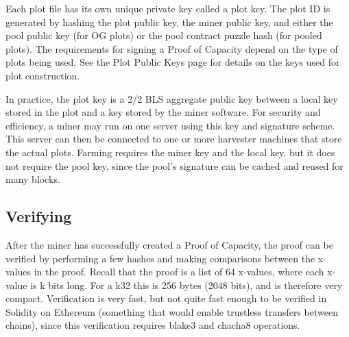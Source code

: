 \begin{flushleft}
    Each plot file has its own unique private key called a plot key. The plot ID is generated by hashing the plot public key, the miner public key, and either the pool public key (for OG plots) or the pool contract puzzle hash (for pooled plots). The requirements for signing a Proof of Capacity depend on the type of plots being used. See the Plot Public Keys page for details on the keys used for plot construction.
\end{flushleft}
\begin{flushleft}
    In practice, the plot key is a 2/2 BLS aggregate public key between a local key stored in the plot and a key stored by the miner software. For security and efficiency, a miner may run on one server using this key and signature scheme. This server can then be connected to one or more harvester machines that store the actual plots. Farming requires the miner key and the local key, but it does not require the pool key, since the pool’s signature can be cached and reused for many blocks.
\end{flushleft}
\subsection{Verifying}
\begin{flushleft}
    After the miner has successfully created a Proof of Capacity, the proof can be verified by performing a few hashes and making comparisons between the x-values in the proof. Recall that the proof is a list of 64 x-values, where each x-value is k bits long. For a k32 this is 256 bytes (2048 bits), and is therefore very compact. Verification is very fast, but not quite fast enough to be verified in Solidity on Ethereum (something that would enable trustless transfers between chains), since this verification requires blake3 and chacha8 operations.
\end{flushleft}

